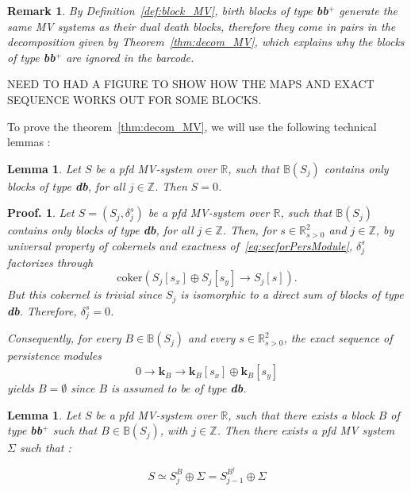 \documentclass[a4paper, english, 11pt]{article}
\newcommand{\kk}[0]{\textbf{k}}
\newcommand{\0}{\vec{0}}
\newcommand{\R}[0]{\mathbb{R}}
\newcommand{\Z}[0]{\mathbb{Z}}
\newtheorem*{pf}{Proof.} }
\newtheorem{remark}[prop]{Remark}
\newtheorem{lem}[prop]{Lemma}
\begin{document}
\begin{remark}
By Definition~\ref{def:block_MV}, birth blocks of type \textbf{bb$^+$} generate the same MV systems as their dual death blocks, therefore  they come in pairs in the decomposition given by Theorem~\ref{thm:decom_MV}, which explains why the blocks of type \textbf{bb$^+$} are ignored in the barcode.
\end{remark}
NEED TO HAD A FIGURE TO SHOW HOW THE MAPS AND EXACT SEQUENCE WORKS OUT FOR SOME BLOCKS.

To prove the theorem~\ref{thm:decom_MV}, we will use the following technical lemmas :

\begin{lem}
Let $S$ be a pfd MV-system over $\R$, such that $\mathbb{B}(S_j)$ contains only blocks of type \textbf{db}, for all $j\in \Z$. Then $S = 0$.

\end{lem}

\begin{pf}
Let $S = (S_j,\delta_j^s)$ be  a pfd MV-system over $\R$, such that $\mathbb{B}(S_j)$ contains only blocks of type \textbf{db}, for all $j\in \Z$. Then, for $s\in \R^2_{s>0}$ and $j\in\Z$, by universal property of cokernels and exactness of~\eqref{eq:secforPersModule}, $\delta^s_j$ factorizes through $$\text{coker}\left (S_j[s_x] \oplus S_j[s_y] \longrightarrow S_j[s] \right ).$$
But this cokernel is trivial 
since $S_j$ is isomorphic to a direct sum of blocks of type \textbf{db}. Therefore, $\delta^s_j = 0$.

Consequently, for every $B\in \mathbb{B}(S_j)$ and every $s\in \R^2_{s>0}$, the exact sequence of persistence modules 
$$0 \longrightarrow \kk_B \longrightarrow \kk_B[s_x] \oplus \kk_B[s_y] $$
yields $B = \emptyset$ since $B$ is assumed to be of type \textbf{db}.
\end{pf}



\begin{lem}
Let $S$ be a pfd MV-system over $\R$, such that there exists  a block $B$ of type \textbf{bb$^+$} such that $B\in\mathbb{B}(S_{j})$, with $j\in\Z$. Then there exists a pfd MV system $\Sigma$ such that : 

$$ S \simeq S_{j}^{B} \oplus \Sigma = S_{j-1}^{B^\dag} \oplus \Sigma  $$
\end{lem}
\end{document}
